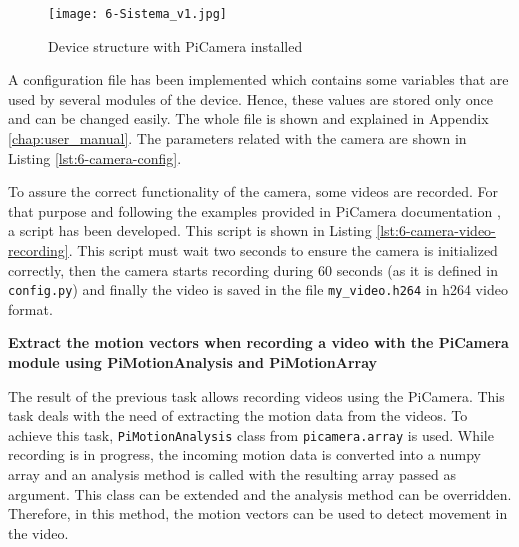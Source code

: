 \begin{figure}[!h]
	\begin{center}
		\texttt{[image: 6-Sistema\_v1.jpg]}
		\caption{Device structure with PiCamera installed}
		\label{fig:6-Sistema_v1}
	\end{center}
\end{figure}

A configuration file has been implemented which contains some variables that are used by several modules of the device. Hence, these values are stored only once and can be changed easily. The whole file is shown and explained in Appendix \ref{chap:user_manual}. The parameters related with the camera are shown in Listing \ref{lst:6-camera-config}.



To assure the correct functionality of the camera, some videos are recorded. For that purpose and following the examples provided in PiCamera documentation \cite{PiCameraDoc}, a script has been developed. This script is shown in Listing \ref{lst:6-camera-video-recording}. This script must wait two seconds to ensure the camera is initialized correctly, then the camera starts recording during 60 seconds (as it is defined in \texttt{config.py}) and finally the video is saved in the file \texttt{my\_video.h264} in h264 video format.




\textbf{Extract the motion vectors when recording a video with the PiCamera module using PiMotionAnalysis and PiMotionArray}

The result of the previous task allows recording videos using the PiCamera. This task deals with the need of extracting the motion data from the videos. To achieve this task, \texttt{PiMotionAnalysis} class from \texttt{picamera.array} is used. While recording is in progress, the incoming motion data is converted into a numpy array and an analysis method is called with the resulting array passed as argument. This class can be extended and the analysis method can be overridden. Therefore, in this method, the motion vectors can be used to detect movement in the video.

